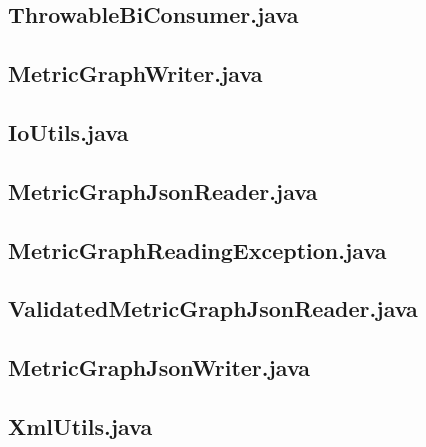 \documentclass{../TechDoc}
\begin{document}
	\subsection{ThrowableBiConsumer.java}
	
	\subsection{MetricGraphWriter.java}
	
	\subsection{IoUtils.java}
	
	\subsection{MetricGraphJsonReader.java}
	
	\subsection{MetricGraphReadingException.java}
	
	\subsection{ValidatedMetricGraphJsonReader.java}
	
	\subsection{MetricGraphJsonWriter.java}
	
	\subsection{XmlUtils.java}
	
\end{document}
